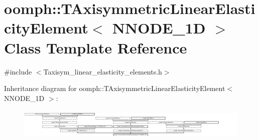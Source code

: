 \hypertarget{classoomph_1_1TAxisymmetricLinearElasticityElement}{}\section{oomph\+:\+:T\+Axisymmetric\+Linear\+Elasticity\+Element$<$ N\+N\+O\+D\+E\+\_\+1D $>$ Class Template Reference}
\label{classoomph_1_1TAxisymmetricLinearElasticityElement}


{\ttfamily \#include $<$Taxisym\+\_\+linear\+\_\+elasticity\+\_\+elements.\+h$>$}

Inheritance diagram for oomph\+:\+:T\+Axisymmetric\+Linear\+Elasticity\+Element$<$ N\+N\+O\+D\+E\+\_\+1D $>$\+:\begin{figure}[H]
\begin{center}
\leavevmode
\includegraphics[height=1.530055cm]{classoomph_1_1TAxisymmetricLinearElasticityElement}
\end{center}
\end{figure}
